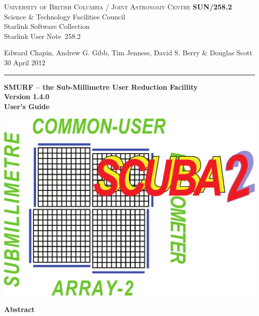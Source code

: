 \documentclass[twoside,11pt]{article}
\newcommand{\stardoccategory}  {Starlink User Note}
\newcommand{\stardocinitials}  {SUN}
\newcommand{\stardocnumber}    {258.2}
\newcommand{\stardocauthors}   {Edward Chapin, Andrew G. Gibb, Tim Jenness, David S. Berry  \& Douglas Scott}
\newcommand{\stardocdate}      {30 April 2012}
\newcommand{\stardoctitle}     {SMURF -- the Sub-Millimetre User Reduction Facillity}
\newcommand{\stardocversion}   {Version 1.4.0}
\newcommand{\stardocmanual}    {User's Guide}
\newcommand{\stardocname}{\stardocinitials /\stardocnumber}
\newenvironment{latexonly}{}{}
\renewcommand{\_}{\texttt{\symbol{95}}}
\begin{document}
\thispagestyle{empty}

\begin{latexonly}
   \textsc{University of British Columbia} / \textsc{Joint Astronomy Centre} \hfill \textbf{\stardocname}\\
   {\large Science \& Technology Facilities Council}\\
   {\large Starlink Software Collection\\}
   {\large \stardoccategory\ \stardocnumber}
   \begin{flushright}
   \stardocauthors\\
   \stardocdate
   \end{flushright}
   \vspace{-4mm}
   \rule{\textwidth}{0.5mm}
   \vspace{5mm}
   \begin{center}
   {\Huge\textbf{\stardoctitle \\ [2.5ex]}}
   {\LARGE\textbf{\stardocversion \\ [4ex]}}
   {\Huge\textbf{\stardocmanual}}
   \end{center}
   \vspace{5mm}

\begin{center}
\includegraphics[scale=0.3]{sun258_logo}
\end{center}

   \vspace{10mm}
   \begin{center}
      {\Large\textbf{Abstract}}
   \end{center}
\end{latexonly}
\end{document}
